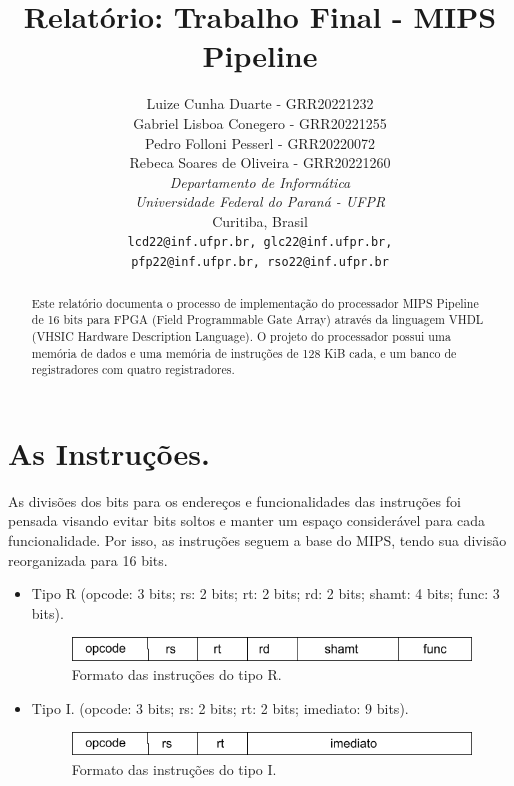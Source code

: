 \documentclass[a4paper, 11pt]{article}
\title{Relatório: Trabalho Final - MIPS Pipeline}
\author{Luize Cunha Duarte - GRR20221232\\
    Gabriel Lisboa Conegero - GRR20221255\\
    Pedro Folloni Pesserl - GRR20220072\\
    Rebeca Soares de Oliveira - GRR20221260\\
\textit{Departamento de Informática}\\
\textit{Universidade Federal do Paraná - UFPR}\\
Curitiba, Brasil\\
\texttt{lcd22@inf.ufpr.br, glc22@inf.ufpr.br,}\\
\texttt{pfp22@inf.ufpr.br, rso22@inf.ufpr.br}}
\date{}
\begin{document}
\maketitle

\begin{abstract}
\begin{singlespace}
Este relatório documenta o processo de implementação do processador MIPS Pipeline de 16
bits para FPGA (Field Programmable Gate Array) através da linguagem VHDL (VHSIC Hardware
Description Language). O projeto do processador possui uma memória de dados e uma
memória de instruções de 128 KiB cada, e um banco de registradores com quatro
registradores. 
\end{singlespace}
\end{abstract}

\section{As Instruções.}
As divisões dos bits para os endereços e funcionalidades das instruções foi pensada
visando evitar bits soltos e manter um espaço considerável para cada funcionalidade.
Por isso, as instruções seguem a base do MIPS, tendo sua divisão reorganizada para
16 bits.
\begin{itemize}
    \item Tipo R (opcode: 3 bits; rs: 2 bits; rt: 2 bits; rd: 2 bits; shamt: 4 bits;
        func: 3 bits).
        \begin{figure}[h]
        \centering
        \includegraphics[width=.6\textwidth]{tipo-r.png}
        \caption{Formato das instruções do tipo R.}
        \end{figure}

    \item Tipo I. (opcode: 3 bits; rs: 2 bits; rt: 2 bits; imediato: 9 bits).
        \begin{figure}[h]
        \centering
        \includegraphics[width=.6\textwidth]{tipo-i.png}
        \caption{Formato das instruções do tipo I.}
        \end{figure}
\end{itemize}
\end{document}
